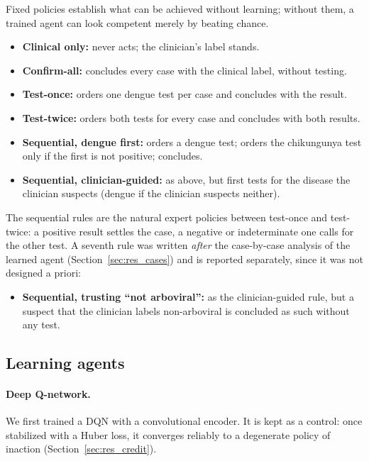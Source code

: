 \documentclass[11pt,a4paper]{article}
\begin{document}
Fixed policies establish what can be achieved without learning; without them, a trained agent can look competent merely by beating chance.
\begin{itemize}
    \item \textbf{Clinical only:} never acts; the clinician's label stands.
    \item \textbf{Confirm-all:} concludes every case with the clinical label, without testing.
    \item \textbf{Test-once:} orders one dengue test per case and concludes with the result.
    \item \textbf{Test-twice:} orders both tests for every case and concludes with both results.
    \item \textbf{Sequential, dengue first:} orders a dengue test; orders the chikungunya test only if the first is not positive; concludes.
    \item \textbf{Sequential, clinician-guided:} as above, but first tests for the disease the clinician suspects (dengue if the clinician suspects neither).
\end{itemize}
The sequential rules are the natural expert policies between test-once and test-twice: a positive result settles the case, a negative or indeterminate one calls for the other test. A seventh rule was written \emph{after} the case-by-case analysis of the learned agent (Section~\ref{sec:res_cases}) and is reported separately, since it was not designed a priori:
\begin{itemize}
    \item \textbf{Sequential, trusting ``not arboviral'':} as the clinician-guided rule, but a suspect that the clinician labels non-arboviral is concluded as such without any test.
\end{itemize}

\subsection{Learning agents}

\paragraph{Deep Q-network.} We first trained a DQN \cite{mnih2015human} with a convolutional encoder. It is kept as a control: once stabilized with a Huber loss, it converges reliably to a degenerate policy of inaction (Section~\ref{sec:res_credit}).
\end{document}
